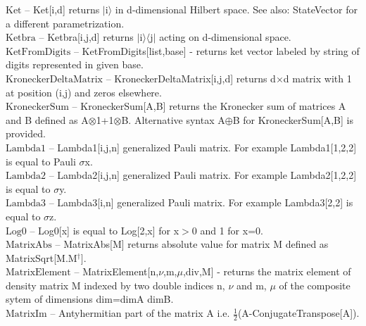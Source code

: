 \documentclass[a4paper,10pt]{scrartcl}
\begin{document}
\textbf{$ \text{Ket} $ }-- Ket[i,d] returns $|$i$\rangle $ in d-dimensional Hilbert space. See also: StateVector for a different parametrization.$  $\\

\textbf{$ \text{Ketbra} $ }-- Ketbra[i,j,d] returns $|$i$\rangle \langle $j$|$ acting on d-dimensional space.$  $\\

\textbf{$ \text{KetFromDigits} $ }-- KetFromDigits[list,base] - returns ket vector labeled by string of digits represented in given base.$  $\\

\textbf{$ \text{KroneckerDeltaMatrix} $ }-- KroneckerDeltaMatrix[i,j,d] returns d$\times $d matrix with 1 at position (i,j) and zeros elsewhere.$  $\\

\textbf{$ \text{KroneckerSum} $ }-- KroneckerSum[A,B] returns the Kronecker sum of matrices A and B defined as A$\otimes $1+1$\otimes $B. Alternative syntax A$\oplus $B for KroneckerSum[A,B] is provided.$  $\\

\textbf{$ \text{Lambda1} $ }-- Lambda1[i,j,n] generalized Pauli matrix. For example Lambda1[1,2,2] is equal to Pauli $\sigma $x.$  $\\

\textbf{$ \text{Lambda2} $ }-- Lambda2[i,j,n] generalized Pauli matrix. For example Lambda2[1,2,2] is equal to $\sigma $y.$  $\\

\textbf{$ \text{Lambda3} $ }-- Lambda3[i,n] generalized Pauli matrix. For example Lambda3[2,2] is equal to $\sigma $z.$  $\\

\textbf{$ \text{Log0} $ }-- Log0[x] is equal to Log[2,x] for x$>$0 and 1 for x=0.$  $\\

\textbf{$ \text{MatrixAbs} $ }-- MatrixAbs[M] returns absolute value for matrix M defined as MatrixSqrt[M.M$  ^{\dagger }\text{].} $\\

\textbf{$ \text{MatrixElement} $ }-- MatrixElement[n,$\nu $,m,$\mu $,div,M] - returns the matrix element of density matrix M indexed by two double indices n, $\nu $ and m, $\mu $ of the composite sytem of dimensions dim=dimA dimB.$  $\\

\textbf{$ \text{MatrixIm} $ }-- Antyhermitian part of the matrix A i.e. $ \frac{1}{2} $(A-ConjugateTranspose[A]).$  $\\
\end{document}
